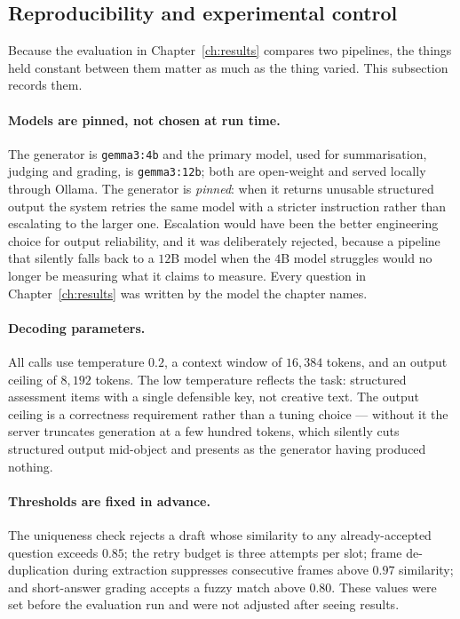 \subsection{Reproducibility and experimental control}
\label{sec:meth-repro}

Because the evaluation in Chapter~\ref{ch:results} compares two pipelines, the
things held constant between them matter as much as the thing varied. This
subsection records them.

\paragraph{Models are pinned, not chosen at run time.} The generator is
\texttt{gemma3:4b} and the primary model, used for summarisation, judging and
grading, is \texttt{gemma3:12b}; both are open-weight and served locally through
Ollama. The generator is \emph{pinned}: when it returns unusable structured
output the system retries the same model with a stricter instruction rather than
escalating to the larger one. Escalation would have been the better engineering
choice for output reliability, and it was deliberately rejected, because a
pipeline that silently falls back to a $12$B model when the $4$B model struggles
would no longer be measuring what it claims to measure. Every question in
Chapter~\ref{ch:results} was written by the model the chapter names.

\paragraph{Decoding parameters.} All calls use temperature $0.2$, a context
window of $16{,}384$ tokens, and an output ceiling of $8{,}192$ tokens. The low
temperature reflects the task: structured assessment items with a single defensible
key, not creative text. The output ceiling is a correctness requirement rather
than a tuning choice --- without it the server truncates generation at a few
hundred tokens, which silently cuts structured output mid-object and presents as
the generator having produced nothing.

\paragraph{Thresholds are fixed in advance.} The uniqueness check rejects a draft
whose similarity to any already-accepted question exceeds $0.85$; the retry
budget is three attempts per slot; frame de-duplication during extraction
suppresses consecutive frames above $0.97$ similarity; and short-answer grading
accepts a fuzzy match above $0.80$. These values were set before the evaluation
run and were not adjusted after seeing results.

